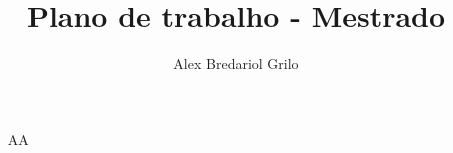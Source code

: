 \title{Plano de trabalho - Mestrado}
\author{Alex Bredariol Grilo}


\begin{itemize}
\item[AA]
\end{itemize}
